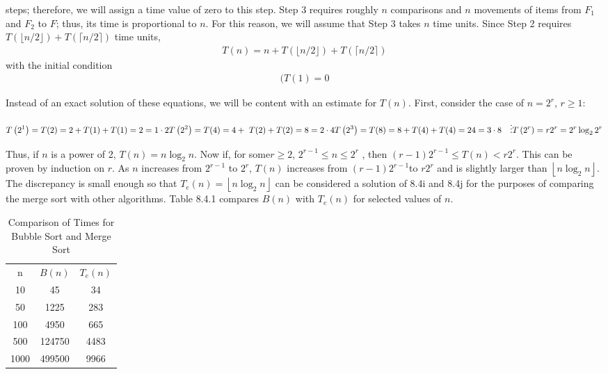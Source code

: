 \documentclass[10pt,]{book}
\theoremstyle{plain}
\theoremstyle{definition}
\theoremstyle{definition}
\theoremstyle{definition}
\theoremstyle{definition}
\numberwithin{equation}{section}
\newcommand{\hrulethick} {\noalign{\hrule height 0.11em}}
\begin{document}
steps; therefore, we will assign a time value of zero to this step. Step 3 requires roughly \(n\) comparisons and \(n\) movements of
items from \(F_1\) and \(F_2\) to \(F\); thus, its time is proportional to \(n\). For this reason, we will assume that Step 3 takes
\(n\) time units. Since Step 2 requires \(T(\lfloor n/2\rfloor ) + T(\lceil n/2\rceil )\) time units,
\begin{gather}
T(n) = n + T(\lfloor n/2\rfloor ) + T(\lceil n/2\rceil )\label{mrow-10}
\end{gather}
with the initial condition
\begin{gather}
(T(1) = 0\label{mrow-11}
\end{gather}
%
\par
Instead of an exact solution of these equations, we will be content with an estimate for \(T(n)\).  First, consider the case of \(n=2^r\), \(r \geq 1\):



\begin{equation*}
T\left(2^1\right)= T(2) = 2 +T(1)+T(1)= 2 = 1\cdot  2\\
\\
T\left(2^2\right) = T(4)=4+\text{  }T(2)+T(2)=8 = 2\cdot 4\\
\\
T\left(2^3\right) =T(8)=8 + T(4)+T(4) =24=3\cdot 8\\
\\
\quad \vdots \\
\\
T\left(2^r\right)=r 2^r= 2^r \log_22^r
\end{equation*}
%
\par
Thus, if \(n\) is a power of 2, \(T(n) = n \log_2 n\). Now if, for some\(r \geq  2\), \(2^{r-1}\leq n\leq 2^r\) , then \((r-1)2^{r-1}\leq
T(n) < r 2^r\). This can be proven by induction on \(r\). As \(n\) increases from \(2^{r-1}\) to \(2^r\), \(T(n)\) increases from \((r-1)2^{r-1}\)to
\(r 2^r\) and is slightly larger than \(\left\lfloor n \log_2n\right\rfloor\). The discrepancy is small enough so that \(T_e(n)=\left\lfloor n \log
_2n\right\rfloor\) can be considered a solution of 8.4i and 8.4j for the purposes of comparing the merge sort with other algorithms. Table 8.4.1
compares \(B(n)\) with \(T_e(n)\) for selected values of \(n\).%
\leavevmode%
\begin{table}
\centering
\begin{tabular}{ccc}\hrulethick
n&\(B(n)\)&\(T_e(n)\)\tabularnewline[0pt]
10&45&34\tabularnewline[0pt]
50&1225&283\tabularnewline[0pt]
100&4950&665\tabularnewline[0pt]
500&124750&4483\tabularnewline[0pt]
1000&499500&9966
\end{tabular}
\caption{Comparison of Times for Bubble Sort and Merge Sort\label{table-sort-analysis}}
\end{table}
\typeout{************************************************}
\typeout{************************************************}
\end{document}
